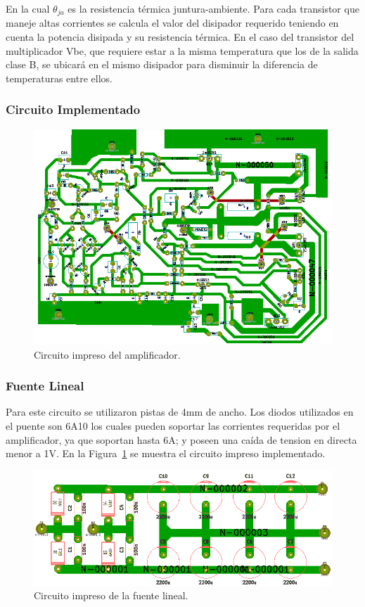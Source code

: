 En la cual $\theta_{ja}$ es la resistencia térmica juntura-ambiente. Para cada transistor que maneje altas corrientes se calcula el valor del disipador requerido teniendo en cuenta la potencia disipada y su resistencia térmica. En el caso del transistor del multiplicador Vbe, que requiere estar a la misma temperatura que los de la salida clase B, se ubicará en el mismo disipador para disminuir la diferencia de temperaturas entre ellos.

\subsubsection{Circuito Implementado}
\begin{figure}[H]
\centerline{
\includegraphics[width=1\textwidth]{img/circuito_implementado_todo.png}}
\caption{Circuito impreso del amplificador.}
\end{figure}

\subsubsection{Fuente Lineal}
\medskip
Para este circuito se utilizaron pistas de 4mm de ancho. Los diodos utilizados en el puente son 6A10 los cuales pueden soportar las corrientes requeridas por el amplificador, ya que soportan hasta 6A; y poseen una caída de tension en directa menor a 1V.
En la Figura~\ref{circuito_impreso_fuente_lineal} se muestra el circuito impreso implementado. 

\begin{figure}[H]
\centering
\centerline{\includegraphics[width=1\textwidth]{img/circuito_impreso_fuente_lineal.png}}
\caption{Circuito impreso de la fuente lineal.}
\label{circuito_impreso_fuente_lineal} 
\end{figure}
\medskip

